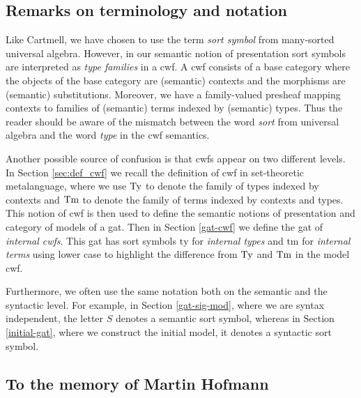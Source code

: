 \documentclass{lmcs}
\newcommand{\FYI}[1]{{\color{red}#1}}
\newcommand{\ty}{\mathrm{ty}}
\newcommand{\tm}{\mathrm{tm}}
\begin{document}

\subsection*{Remarks on terminology and notation}
Like Cartmell, we have chosen to use the term {\em sort symbol} from many-sorted universal algebra. However, in our semantic notion of \FYI{presentation} sort symbols are interpreted as {\em type families} in a cwf. A cwf consists of a base category where the objects of the base category are (semantic) contexts and the morphisms are (semantic) substitutions. Moreover, we have a family-valued presheaf mapping contexts to families of (semantic) terms indexed by (semantic) types. Thus the reader should be aware of the mismatch between the word {\em sort} from universal algebra and the word {\em type} in the cwf semantics.

Another possible source of confusion is that cwfs appear on two different levels. In Section \ref{sec:def_cwf} we recall the definition of cwf in set-theoretic metalanguage, where we use $\mathrm{Ty}$ to denote the family of types indexed by contexts and $\mathrm{Tm}$ to denote the family of terms indexed by contexts and types. This notion of cwf is then used to define the semantic notions of \FYI{presentation} and category of models of a gat. Then in Section \ref{gat-cwf} we define the gat of {\em internal cwfs}. This gat has sort symbols $\ty$ for {\em internal types} and $\tm$ for {\em internal terms} using lower case to highlight the difference from $\mathrm{Ty}$ and $\mathrm{Tm}$ in the model cwf.

Furthermore, we often use the same notation both on the semantic and the syntactic level. For example, in Section \ref{gat-sig-mod},  where we are syntax independent, the letter $S$ denotes a semantic sort symbol, whereas in Section \ref{initial-gat}, where we construct the initial model, it denotes a syntactic sort symbol.

\subsection*{To the memory of Martin Hofmann}
\end{document}
